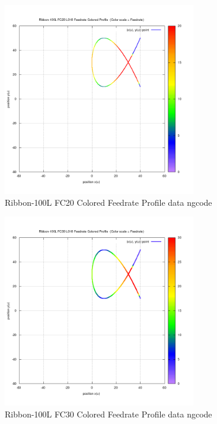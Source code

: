 \begin{figure}
	\caption     {Ribbon-100L FC20 Colored Feedrate Profile data ngcode}
	\label{18-img-Ribbon-100L-FC20-Colored-Feedrate-Profile-data_ngcode.png}
\includegraphics[width=0.75\textwidth]{Chap4/appendix/app-Ribbon-100L/plots/18-img-Ribbon-100L-FC20-Colored-Feedrate-Profile-data_ngcode.png}
\end{figure}

\clearpage
\pagebreak

\begin{figure}
	\caption     {Ribbon-100L FC30 Colored Feedrate Profile data ngcode}
	\label{19-img-Ribbon-100L-FC30-Colored-Feedrate-Profile-data_ngcode.png}
\includegraphics[width=0.75\textwidth]{Chap4/appendix/app-Ribbon-100L/plots/19-img-Ribbon-100L-FC30-Colored-Feedrate-Profile-data_ngcode.png}
\end{figure}



